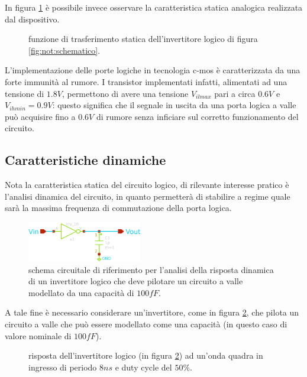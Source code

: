 	In figura \ref{fig:not:carattstatica} è possibile invece osservare la caratteristica statica analogica realizzata dal dispositivo.
	
	\begin{figure}[H]
		\centering
		
		\caption{funzione di trasferimento statica dell'invertitore logico di figura \ref{fig:not:schematico}.}
		\label{fig:not:carattstatica}
	\end{figure}

	L'implementazione delle porte logiche in tecnologia c-mos è caratterizzata da una forte immunità al rumore. I transistor implementati infatti, alimentati ad una tensione di $1.8V$, permettono di avere una tensione $V_{ilmax}$ pari a circa $0.6V$ e $V_{ihmin} = 0.9V$: questo significa che il segnale in uscita da una porta logica a valle può acquisire fino a $0.6V$ di rumore senza inficiare sul corretto funzionamento del circuito.
	
	\subsection*{Caratteristiche dinamiche}
		
		Nota la caratteristica statica del circuito logico, di rilevante interesse pratico è l'analisi dinamica del circuito, in quanto permetterà di stabilire a regime quale sarà la massima frequenza di commutazione della porta logica.
		
		\begin{figure}[bht]
			\centering
			\includegraphics[width=5cm]{Immagini/not-gate-carico}
			\caption{schema circuitale di riferimento per l'analisi della risposta dinamica di un invertitore logico che deve pilotare un circuito a valle modellato da una capacità di $100fF$.}
			\label{fig:not:dinamica-schema}
		\end{figure}
		
		A tale fine è necessario considerare un'invertitore, come in figura \ref{fig:not:dinamica-schema}, che pilota un circuito a valle che può essere modellato come una capacità (in questo caso di valore nominale di $100fF$).
	
		\begin{figure}[bht]
			\centering
			
			\caption{risposta dell'invertitore logico (in figura \ref{fig:not:dinamica-schema}) ad un'onda quadra in ingresso di periodo $8ns$ e duty cycle del $50\%$.}
			\label{fig:not:dinamica}
		\end{figure}
		
